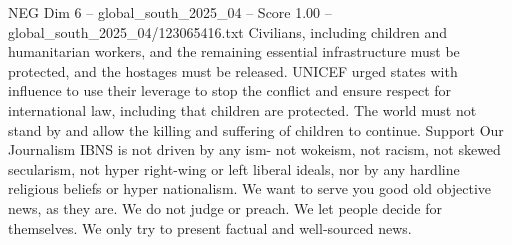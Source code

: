 \begin{textsample}{NEG Dim 6 – global\_south\_2025\_04 – Score 1.00 – global\_south\_2025\_04/123065416.txt}
Civilians, including children and humanitarian workers, and the remaining essential infrastructure must be protected, and the hostages must be released.
UNICEF urged states with influence to use their leverage to stop the conflict and ensure respect for international law, including that children are protected.
The world must not stand by and allow the killing and suffering of children to continue.
Support Our Journalism IBNS is not driven by any ism- not wokeism, not racism, not skewed secularism, not hyper right-wing or left liberal ideals, nor by any hardline religious beliefs or hyper nationalism.
We want to serve you good old objective news, as they are.
We do not judge or preach.
We let people decide for themselves.
We only try to present factual and well-sourced news.

\end{textsample}
